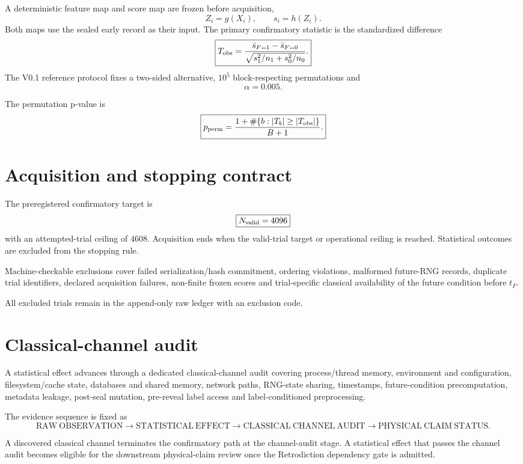 A deterministic feature map and score map are frozen before acquisition,
\[
Z_i=g(X_i),
\qquad
s_i=h(Z_i).
\]
Both maps use the sealed early record as their input. The primary confirmatory statistic is the standardized difference
\[
\boxed{
T_{\rm obs}
=\frac{\bar s_{F=1}-\bar s_{F=0}}
{\sqrt{s_1^2/n_1+s_0^2/n_0}}.
}
\]
The V0.1 reference protocol fixes a two-sided alternative, $10^5$ block-respecting permutations and
\[
\boxed{\alpha=0.005.}
\]

The permutation p-value is
\[
\boxed{
p_{\rm perm}
=\frac{1+\#\{b:|T_b|\ge |T_{\rm obs}|\}}
{B+1}.
}
\]

\section{Acquisition and stopping contract}

The preregistered confirmatory target is
\[
\boxed{N_{\rm valid}=4096}
\]
with an attempted-trial ceiling of $4608$. Acquisition ends when the valid-trial target or operational ceiling is reached. Statistical outcomes are excluded from the stopping rule.

Machine-checkable exclusions cover failed serialization/hash commitment, ordering violations, malformed future-RNG records, duplicate trial identifiers, declared acquisition failures, non-finite frozen scores and trial-specific classical availability of the future condition before $t_F$.

All excluded trials remain in the append-only raw ledger with an exclusion code.

\section{Classical-channel audit}

A statistical effect advances through a dedicated classical-channel audit covering process/thread memory, environment and configuration, filesystem/cache state, databases and shared memory, network paths, RNG-state sharing, timestamps, future-condition precomputation, metadata leakage, post-seal mutation, pre-reveal label access and label-conditioned preprocessing.

The evidence sequence is fixed as
\[
\boxed{
\mathrm{RAW\ OBSERVATION}
\to
\mathrm{STATISTICAL\ EFFECT}
\to
\mathrm{CLASSICAL\ CHANNEL\ AUDIT}
\to
\mathrm{PHYSICAL\ CLAIM\ STATUS}.
}
\]

A discovered classical channel terminates the confirmatory path at the channel-audit stage. A statistical effect that passes the channel audit becomes eligible for the downstream physical-claim review once the Retrodiction dependency gate is admitted.

